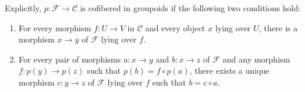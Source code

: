 \noindent
Explicitly, $p: \mathcal{F} \to \mathcal{C}$ is cofibered in groupoids if
the following two conditions hold:
\begin{enumerate}
\item For every morphism $f: U \to V$ in $\mathcal{C}$ and every object
$x$ lying over $U$, there is a morphism $x \to y$ of $\mathcal{F}$ lying
over $f$.
\item For every pair of morphisms $a: x \to y$ and $b: x \to z$
of $\mathcal{F}$ and any morphism $f: p(y) \to p(z)$ such that $p(b) = f
\circ p(a)$, there exists a unique morphism $c: y \to z$ of $\mathcal
F$ lying over $f$ such that $b = c \circ a$.
\end{enumerate}
